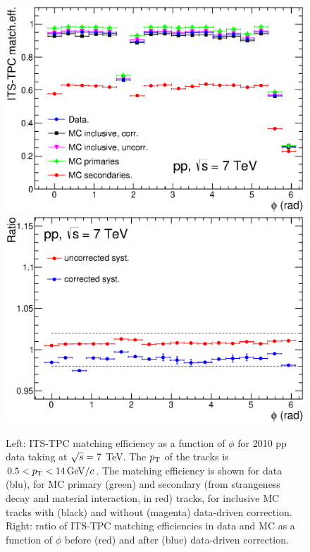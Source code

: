\begin{figure}[!htb]
\begin{center}
\includegraphics[width=.49\textwidth]{FigCap4/ITSTPCmatchEff_10bpass4_vsPhi.eps}
\includegraphics[width=.49\textwidth]{FigCap4/ITSTPCmatchEffSyst_10bpass4_vsPhi.eps}
\caption{Left: ITS-TPC matching efficiency as a function of $\phi$ for 2010 pp data taking at $\sqrt{s} = 7$ TeV. The $p_{\rm T}$ of the tracks is \mbox{$0.5 < p_{\rm T} < 14 \, \mathrm{GeV}/c$}. The matching efficiency is shown for data (blu), for MC primary (green) and secondary (from strangeness decay and material interaction, in red) tracks, for inclusive MC tracks with (black) and without (magenta) data-driven correction. Right: ratio of ITS-TPC matching efficiencies in data and MC as a function of $\phi$ before (red) and after (blue) data-driven correction.}
\label{fig:CorrMatchEffVsPhi}
\end{center}
\end{figure}

